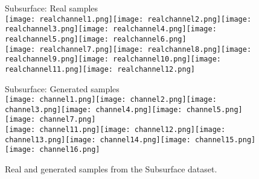 \begin{figure}[t]
	\centering
	Subsurface: Real samples\\
	\texttt{[image: realchannel1.png]}\hspace{5px}\texttt{[image: realchannel2.png]}\hspace{5px}\texttt{[image: realchannel3.png]}\hspace{5px}\texttt{[image: realchannel4.png]}\hspace{5px}\texttt{[image: realchannel5.png]}\hspace{5px}\texttt{[image: realchannel6.png]}\\
	\vspace{0.1cm}
	\texttt{[image: realchannel7.png]}\hspace{5px}\texttt{[image: realchannel8.png]}\hspace{5px}\texttt{[image: realchannel9.png]}\hspace{5px}\texttt{[image: realchannel10.png]}\hspace{5px}\texttt{[image: realchannel11.png]}\hspace{5px}\texttt{[image: realchannel12.png]}
	
	Subsurface: Generated samples\\
	\texttt{[image: channel1.png]}\hspace{5px}\texttt{[image: channel2.png]}\hspace{5px}\texttt{[image: channel3.png]}\hspace{5px}\texttt{[image: channel4.png]}\hspace{5px}\texttt{[image: channel5.png]}\hspace{5px}\texttt{[image: channel7.png]}\\
	\vspace{0.1cm}
	\texttt{[image: channel11.png]}\hspace{5px}\texttt{[image: channel12.png]}\hspace{5px}\texttt{[image: channel13.png]}\hspace{5px}\texttt{[image: channel14.png]}\hspace{5px}\texttt{[image: channel15.png]}\hspace{5px}\texttt{[image: channel16.png]}\\
	
	\caption{Real and generated samples from the Subsurface dataset.}
	\label{fig:samples_subsurface}
\end{figure}


